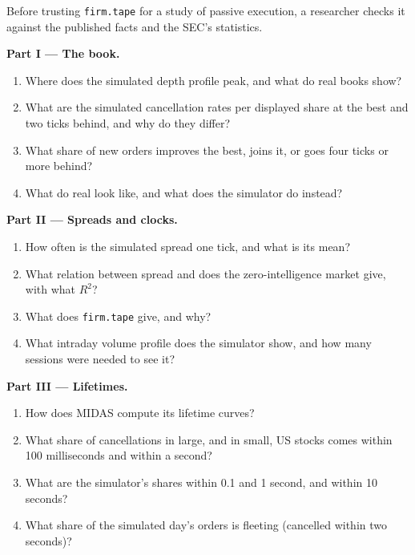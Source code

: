 \begin{problem}\label{pb:mx:empirical-facts-of-order-books:1}
Before trusting \texttt{firm.tape} for a study of passive execution, a researcher checks it against the published facts and the SEC's statistics.

\medskip\noindent\textbf{Part I --- The book.}
\begin{enumerate}
\item Where does the simulated depth profile peak, and what do real books show?
\item What are the simulated cancellation rates per displayed share at the best and two ticks behind, and why do they differ?
\item What share of new orders improves the best, joins it, or goes four ticks or more behind?
\item What do real  look like, and what does the simulator do instead?
\end{enumerate}

\medskip\noindent\textbf{Part II --- Spreads and clocks.}
\begin{enumerate}[resume]
\item How often is the simulated spread one tick, and what is its mean?
\item What relation between spread and  does the zero-intelligence market give, with what $R^2$?
\item What does \texttt{firm.tape} give, and why?
\item What intraday volume profile does the simulator show, and how many sessions were needed to see it?
\end{enumerate}

\medskip\noindent\textbf{Part III --- Lifetimes.}
\begin{enumerate}[resume]
\item How does MIDAS compute its lifetime curves?
\item What share of cancellations in large, and in small, US stocks comes within 100 milliseconds and within a second?
\item What are the simulator's shares within 0.1 and 1 second, and within 10 seconds?
\item What share of the simulated day's orders is fleeting (cancelled within two seconds)?
\end{enumerate}


\end{problem}

